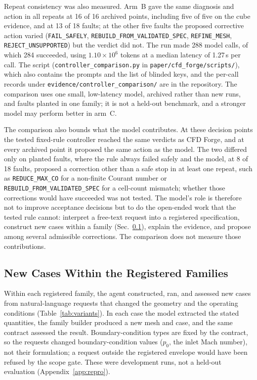 \documentclass[11pt]{article}
\begin{document}
{\sloppy
Repeat consistency was also measured. Arm~B gave the same diagnosis and action
in all repeats at 16 of 16 archived points, including five of five on the cube
evidence, and at 13 of 18 faults; at the other five faults the proposed
corrective action varied (\texttt{FAIL\_SAFELY},
\texttt{REBUILD\_FROM\_VALIDATED\_SPEC}, \texttt{REFINE\_MESH},
\texttt{REJECT\_UNSUPPORTED}) but the verdict did not. The run made 288 model
calls, of which 284 succeeded, using $1.10\times10^6$ tokens at a median
latency of 1.27\,s per call. The script (\texttt{controller\_comparison.py} in
\texttt{paper/cfd\_forge/scripts/}), which also contains the prompts and the
list of blinded keys, and the per-call records under
\texttt{evidence/controller\_comparison/} are in the repository. The
comparison uses one small, low-latency model, archived rather than new runs,
and faults planted in one family; it is not a held-out benchmark, and a
stronger model may perform better in arm~C.

The comparison also bounds what the model contributes. At these decision
points the tested fixed-rule controller reached the same verdicts as CFD Forge,
and at every archived point it proposed the same action as the model. The two
differed only on planted faults, where the rule always failed safely and the
model, at 8 of 18 faults, proposed a correction other than a safe stop in at least one
repeat, such as \texttt{REDUCE\_MAX\_CO} for a non-finite Courant number or
\texttt{REBUILD\_FROM\_VALIDATED\_SPEC} for a cell-count mismatch; whether those
corrections would have succeeded was not tested. The model's role is therefore
not to improve acceptance decisions but to do the open-ended work that the
tested rule cannot: interpret a free-text request into a registered
specification, construct new cases within a family
(Sec.~\ref{sec:variants}), explain the evidence, and propose among several
admissible corrections. The comparison does not measure those contributions.
\par}
\subsection{New Cases Within the Registered Families}
\label{sec:variants}

Within each registered family, the agent constructed, ran, and assessed new
cases from natural-language requests that changed the geometry and the
operating conditions (Table~\ref{tab:variants}). In each case the model
extracted the stated quantities, the family builder produced a new mesh and
case, and the same contract assessed the result. Boundary-condition types are
fixed by the contract, so the requests changed boundary-condition values
($p_0$, the inlet Mach number), not their formulation; a request outside the
registered envelope would have been refused by the scope gate. These were
development runs, not a held-out evaluation (Appendix~\ref{app:repro}).
\end{document}
